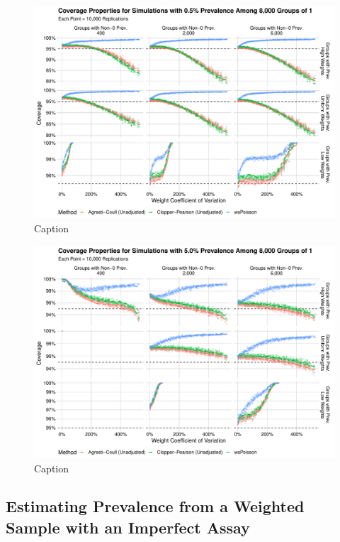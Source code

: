 \documentclass[AMA,STIX1COL]{WileyNJD-v2}
\begin{document}
\begin{figure}
    \centering
    \includegraphics[width=\textwidth]{figures/perfect_coverage_8000_0_005_reduced.pdf}
    \caption{Caption}
    \label{fig:perfect_coverage_8000_0_005_reduced}
\end{figure}

\begin{figure}
    \centering
    \includegraphics[width=\textwidth]{figures/perfect_coverage_8000_0_05_reduced.pdf}
    \caption{Caption}
    \label{fig:perfect_coverage_8000_0_05_reduced.pdf}
\end{figure}



\subsection{Estimating Prevalence from a Weighted Sample with an Imperfect Assay}
\end{document}
